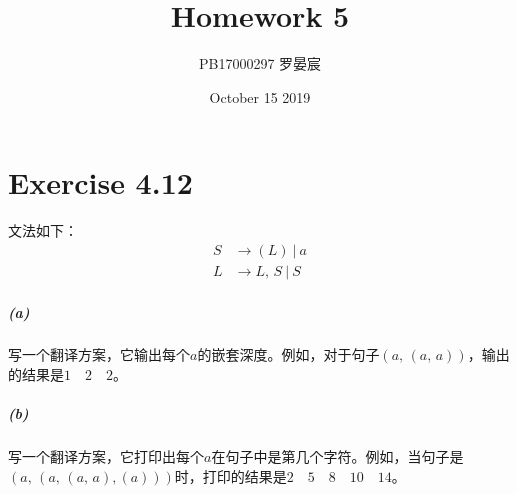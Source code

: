 \documentclass{article}
\title{Homework 5}
\author{PB17000297 罗晏宸}
\date{October 15 2019}
\begin{document}
\maketitle

\section{Exercise 4.12}
文法如下：
\begin{align*}
    S &\rightarrow (L)\ |\ a \\
    L &\rightarrow L,\,S\ |\ S
\end{align*}
\subparagraph{(a)}
写一个翻译方案，它输出每个$a$的嵌套深度。例如，对于句子$(a,\,(a,\,a))$，输出的结果是$1\quad2\quad2$。
\subparagraph{(b)}
写一个翻译方案，它打印出每个$a$在句子中是第几个字符。例如，当句子是$(a,\,(a,\,(a,\,a),(a)))$时，打印的结果是$2\quad5\quad8\quad10\quad14$。
\end{document}
